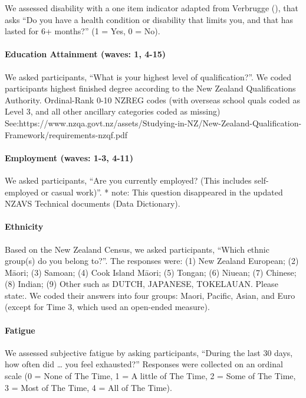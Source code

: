 \documentclass[
  singlecolumn]{article}
\let\oldparagraph\paragraph
\renewcommand{\paragraph}[1]{\oldparagraph{#1}\mbox{}}
\begin{document}
We assessed disability with a one item indicator adapted from Verbrugge
(), that asks ``Do you have a health
condition or disability that limits you, and that has lasted for 6+
months?'' (1 = Yes, 0 = No).

\paragraph{Education Attainment (waves: 1,
4-15)}\label{education-attainment-waves-1-4-15}

We asked participants, ``What is your highest level of qualification?''.
We coded participants highest finished degree according to the New
Zealand Qualifications Authority. Ordinal-Rank 0-10 NZREG codes (with
overseas school quals coded as Level 3, and all other ancillary
categories coded as missing)
See:https://www.nzqa.govt.nz/assets/Studying-in-NZ/New-Zealand-Qualification-Framework/requirements-nzqf.pdf

\paragraph{Employment (waves: 1-3,
4-11)}\label{employment-waves-1-3-4-11}

We asked participants, ``Are you currently employed? (This includes
self-employed or casual work)''. * note: This question disappeared in
the updated NZAVS Technical documents (Data Dictionary).

\paragraph{Ethnicity}\label{ethnicity}

Based on the New Zealand Census, we asked participants, ``Which ethnic
group(s) do you belong to?''. The responses were: (1) New Zealand
European; (2) Māori; (3) Samoan; (4) Cook Island Māori; (5) Tongan; (6)
Niuean; (7) Chinese; (8) Indian; (9) Other such as DUTCH, JAPANESE,
TOKELAUAN. Please state:. We coded their answers into four groups:
Maori, Pacific, Asian, and Euro (except for Time 3, which used an
open-ended measure).

\paragraph{Fatigue}\label{fatigue}

We assessed subjective fatigue by asking participants, ``During the last
30 days, how often did \ldots{} you feel exhausted?'' Responses were
collected on an ordinal scale (0 = None of The Time, 1 = A little of The
Time, 2 = Some of The Time, 3 = Most of The Time, 4 = All of The Time).
\end{document}
